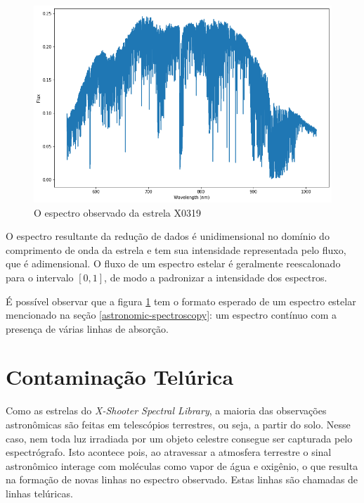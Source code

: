 \begin{figure}[htb]
\centering
\includegraphics[width=15cm]{figuras/X0319_obs_spectrum.png}
\caption{O espectro observado da estrela X0319}
\label{fig:x0319-obs-spectrum}
\end{figure}

O espectro resultante da redução de dados é unidimensional no domínio do comprimento de onda da estrela e tem sua intensidade representada pelo fluxo, que é adimensional. O fluxo de um espectro estelar é geralmente reescalonado para o intervalo $[0, 1]$, de modo a padronizar a intensidade dos espectros. 

É possível observar que a figura \ref{fig:x0319-obs-spectrum} tem o formato esperado de um espectro estelar mencionado na seção \ref{astronomic-spectroscopy}: um espectro contínuo com a presença de várias linhas de absorção.


\section{Contaminação Telúrica}

Como as estrelas do \textit{X-Shooter Spectral Library}, a maioria das observações astronômicas são feitas em telescópios terrestres, ou seja, a partir do solo. Nesse caso, nem toda luz irradiada por um objeto celestre consegue ser capturada pelo espectrógrafo. Isto acontece pois, ao atravessar a atmosfera terrestre o sinal astronômico interage com moléculas como vapor de água e oxigênio, o que resulta na formação de novas linhas no espectro observado. Estas linhas são chamadas de linhas telúricas.

